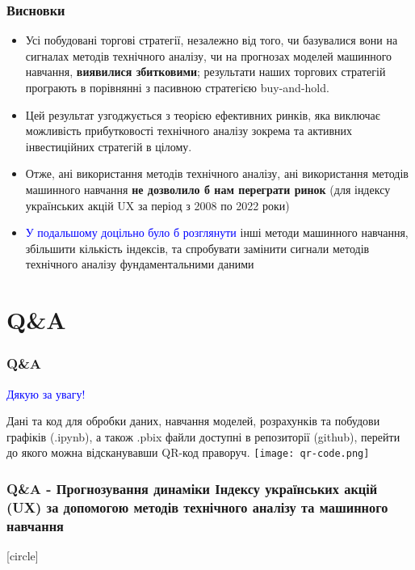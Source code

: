 \documentclass[aspectratio=169]{beamer}
\begin{document}
\begin{frame}
\frametitle{Висновки}
\begin{itemize}
\item Усі побудовані торгові стратегії, незалежно від того, чи базувалися вони на 
сигналах  методів  технічного  аналізу,  чи  на  прогнозах  моделей  машинного навчання, \alert {\textbf{виявилися збитковими}}; результати наших торгових стратегій програють в порівнянні з пасивною  стратегією  buy-and-hold.  
\bigskip
\item Цей  результат  узгоджується  з  теорією ефективних ринків, яка виключає можливість прибутковості технічного аналізу зокрема та активних інвестиційних стратегій в цілому.
\bigskip
\item Отже, ані використання методів технічного аналізу, ані використання методів машинного навчання \alert {\textbf{не дозволило б нам переграти ринок}} (для індексу українських акцій UX за період з 2008 по 2022 роки)
\bigskip
{}
\item \textcolor{blue} {У подальшому доцільно було б розглянути} інші  методи  машинного навчання, збільшити кількість індексів, та спробувати замінити сигнали  методів технічного  аналізу  фундаментальними даними
\bigskip
\end{itemize}
\end{frame}

\section{Q\&A}

\begin{frame}
\frametitle{Q\&A}
\begin{center}
\bigskip
\textcolor{blue}{\huge Дякую за увагу!} \\
\end{center}
\begin{multicols}{2}

\vbox{\vspace{0.8cm}}
Дані та код для обробки даних, навчання моделей, розрахунків та побудови графіків (.ipynb), а також .pbix файли доступні в репозиторії (github), перейти до якого можна {відсканувавши QR-код праворуч.}
\columnbreak
\hspace{5mm}
\texttt{[image: qr-code.png]}
\end{multicols}
\end{frame}

\begin{frame}
\frametitle {Q\&A - Прогнозування динаміки Індексу українських акцій (UX) за допомогою методів технічного аналізу та машинного навчання}
[circle]
\tableofcontents
\end{frame}
\end{document}
